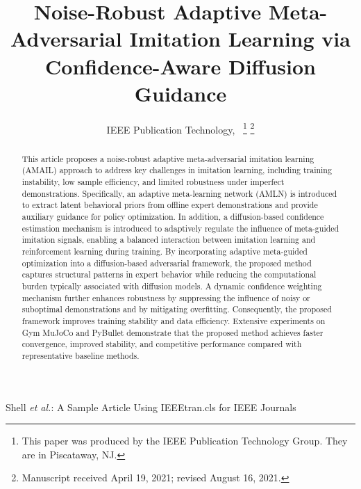 \documentclass[journal]{IEEEtran}
\begin{document}
\title{Noise-Robust Adaptive Meta-Adversarial Imitation Learning via Confidence-Aware Diffusion Guidance}

\author{IEEE Publication Technology,~
\thanks{This paper was produced by the IEEE Publication Technology Group. They are in Piscataway, NJ.}%
\thanks{Manuscript received April 19, 2021; revised August 16, 2021.}}

%
{Shell \MakeLowercase{\textit{et al.}}: A Sample Article Using IEEEtran.cls for IEEE Journals}


\maketitle

\begin{abstract}
This article proposes a noise-robust adaptive meta-adversarial imitation learning (AMAIL) approach to address key challenges in imitation learning, including training instability, low sample efficiency, and limited robustness under imperfect demonstrations. Specifically, an adaptive meta-learning network (AMLN) is introduced to extract latent behavioral priors from offline expert demonstrations and provide auxiliary guidance for policy optimization. In addition, a diffusion-based confidence estimation mechanism is introduced to adaptively regulate the influence of meta-guided imitation signals, enabling a balanced interaction between imitation learning and reinforcement learning during training.
By incorporating adaptive meta-guided optimization into a diffusion-based adversarial framework, the proposed method captures structural patterns in expert behavior while reducing the computational burden typically associated with diffusion models. 
A dynamic confidence weighting mechanism further enhances robustness by suppressing the influence of noisy or suboptimal demonstrations and by mitigating overfitting. Consequently, the proposed framework improves training stability and data efficiency.
Extensive experiments on Gym MuJoCo and PyBullet demonstrate that the proposed method achieves faster convergence, improved stability, and competitive performance compared with representative baseline methods.
\end{abstract}
\end{document}
